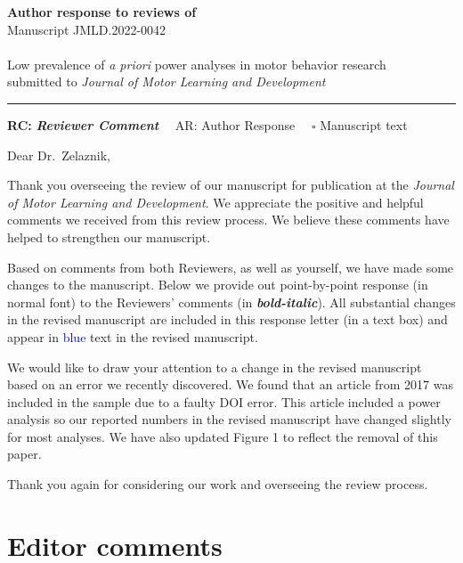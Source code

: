 \documentclass[final]{article}
\begin{document}
{\Large\bf Author response to reviews of}\\[1em]
Manuscript JMLD.2022-0042\\ \\
{\Large Low prevalence of \emph{a priori} power analyses in motor behavior research}\\[1em]

{submitted to \it Journal of Motor Learning and Development }\\
\hrule

\hfill {\bfseries RC:} \textbf{\textit{Reviewer Comment}}\(\quad\) AR: Author Response \(\quad\square\) Manuscript text

\vspace{2em}

Dear Dr.~Zelaznik,

Thank you overseeing the review of our manuscript for publication at the \emph{Journal of Motor Learning and Development}. We appreciate the positive and helpful comments we received from this review process. We believe these comments have helped to strengthen our manuscript.

Based on comments from both Reviewers, as well as yourself, we have made some changes to the manuscript. Below we provide out point-by-point response (in normal font) to the Reviewers' comments (in \textbf{\emph{bold-italic}}). All substantial changes in the revised manuscript are included in this response letter (in a text box) and appear in \textcolor{blue}{blue} text in the revised manuscript.

We would like to draw your attention to a change in the revised manuscript based on an error we recently discovered. We found that an article from 2017 was included in the sample due to a faulty DOI error. This article included a power analysis so our reported numbers in the revised manuscript have changed slightly for most analyses. We have also updated Figure 1 to reflect the removal of this paper.

Thank you again for considering our work and overseeing the review process.

\hypertarget{editor-comments}{%
\section{Editor comments}\label{editor-comments}}

\end{document}
